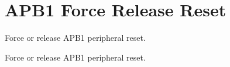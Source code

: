 \hypertarget{group___r_c_c_ex___a_p_b1___force___release___reset}{}\section{A\+P\+B1 Force Release Reset}
\label{group___r_c_c_ex___a_p_b1___force___release___reset}


Force or release A\+P\+B1 peripheral reset.  


Force or release A\+P\+B1 peripheral reset. 

